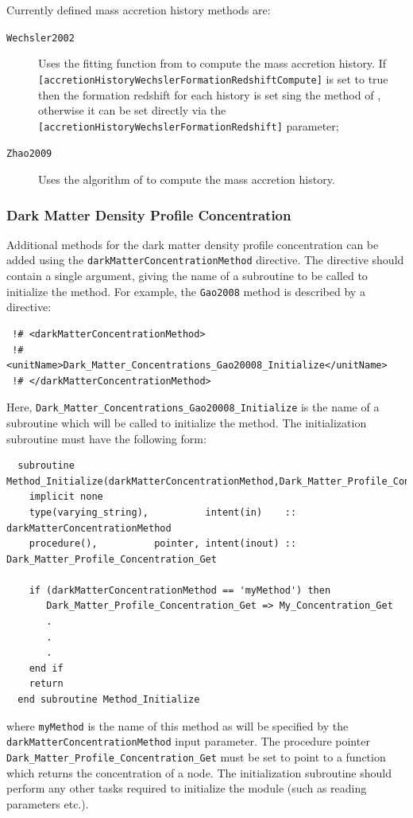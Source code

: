 Currently defined mass accretion history methods are:
\begin{description}
 \item [{\tt Wechsler2002}] Uses the fitting function from \cite{wechsler_concentrations_2002} to compute the mass accretion history. If {\tt [accretionHistoryWechslerFormationRedshiftCompute]} is set to true then the formation redshift for each history is set sing the method of \cite{bullock_profiles_2001}, otherwise it can be set directly via the {\tt [accretionHistoryWechslerFormationRedshift]} parameter;
 \item [{\tt Zhao2009}] Uses the algorithm of \cite{zhao_accurate_2009} to compute the mass accretion history.
\end{description}

\subsubsection{Dark Matter Density Profile Concentration}

Additional methods for the dark matter density profile concentration can be added using the {\tt darkMatterConcentrationMethod} directive. The directive should contain a single argument, giving the name of a subroutine to be called to initialize the method. For example, the {\tt Gao2008} method is described by a directive:
\begin{verbatim}
 !# <darkMatterConcentrationMethod>
 !#  <unitName>Dark_Matter_Concentrations_Gao20008_Initialize</unitName>
 !# </darkMatterConcentrationMethod>
\end{verbatim}
Here, {\tt Dark\_Matter\_Concentrations\_Gao20008\_Initialize} is the name of a subroutine which will be called to initialize the method. The initialization subroutine must have the following form:
\begin{verbatim}
  subroutine Method_Initialize(darkMatterConcentrationMethod,Dark_Matter_Profile_Concentration_Get)
    implicit none
    type(varying_string),          intent(in)    :: darkMatterConcentrationMethod
    procedure(),          pointer, intent(inout) :: Dark_Matter_Profile_Concentration_Get
    
    if (darkMatterConcentrationMethod == 'myMethod') then
       Dark_Matter_Profile_Concentration_Get => My_Concentration_Get
       .
       .
       .
    end if
    return
  end subroutine Method_Initialize
\end{verbatim}
where {\tt myMethod} is the name of this method as will be specified by the {\tt darkMatterConcentrationMethod} input parameter. The procedure pointer {\tt Dark\_Matter\_Profile\_Concentration\_Get} must be set to point to a function which returns the concentration of a node. The initialization subroutine should perform any other tasks required to initialize the module (such as reading parameters etc.).

